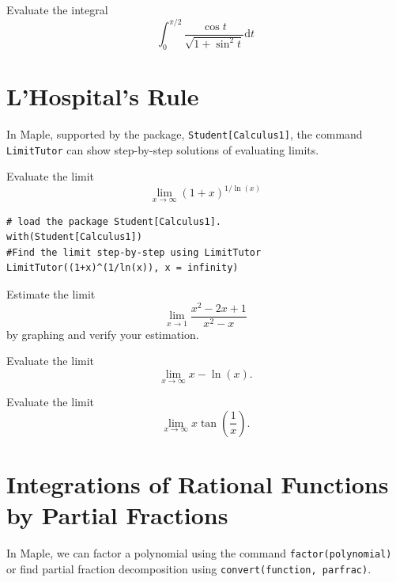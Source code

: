 \documentclass[]{book}
\theoremstyle{definition}
\theoremstyle{definition}
\theoremstyle{definition}
\theoremstyle{remark}
\let\BeginKnitrBlock\begin \let\EndKnitrBlock\end
\begin{document}
\BeginKnitrBlock{exercise}
\protect\hypertarget{exr:unnamed-chunk-8}{}{\label{exr:unnamed-chunk-8} }
Evaluate the integral
\[
\int_{0}^{\pi / 2} \frac{\cos t}{\sqrt{1+\sin ^{2} t}} \mathrm{d} t
\]
\EndKnitrBlock{exercise}

\hypertarget{lhospitals-rule}{%
\chapter{L'Hospital's Rule}\label{lhospitals-rule}}

In Maple, supported by the package, \texttt{Student{[}Calculus1{]}}, the command \texttt{LimitTutor} can show step-by-step solutions of evaluating limits.

\BeginKnitrBlock{example}
\protect\hypertarget{exm:unnamed-chunk-1}{}{\label{exm:unnamed-chunk-1} }
Evaluate the limit
\[
\lim\limits_{x\to \infty}(1+x)^{1/\ln(x)}
\]
\EndKnitrBlock{example}

\BeginKnitrBlock{solution}
{}

\begin{verbatim}
# load the package Student[Calculus1].
with(Student[Calculus1])
#Find the limit step-by-step using LimitTutor
LimitTutor((1+x)^(1/ln(x)), x = infinity)
\end{verbatim}
\EndKnitrBlock{solution}

\BeginKnitrBlock{exercise}
\protect\hypertarget{exr:unnamed-chunk-3}{}{\label{exr:unnamed-chunk-3} }
Estimate the limit
\[
\lim\limits_{x\to 1}\frac{x^2-2x+1}{x^2-x}
\]
by graphing and verify your estimation.
\EndKnitrBlock{exercise}

\BeginKnitrBlock{exercise}
\protect\hypertarget{exr:unnamed-chunk-4}{}{\label{exr:unnamed-chunk-4} }
Evaluate the limit
\[
\lim\limits_{x\to \infty} x-\ln(x).
\]
\EndKnitrBlock{exercise}

\BeginKnitrBlock{exercise}
\protect\hypertarget{exr:unnamed-chunk-5}{}{\label{exr:unnamed-chunk-5} }
Evaluate the limit
\[
\lim\limits_{x\to \infty} x\tan(\frac1x).
\]
\EndKnitrBlock{exercise}

\hypertarget{integrations-of-rational-functions-by-partial-fractions}{%
\chapter{Integrations of Rational Functions by Partial Fractions}\label{integrations-of-rational-functions-by-partial-fractions}}

In Maple, we can factor a polynomial using the command \texttt{factor(polynomial)} or find partial fraction decomposition using \texttt{convert(function,\ parfrac)}.
\end{document}
